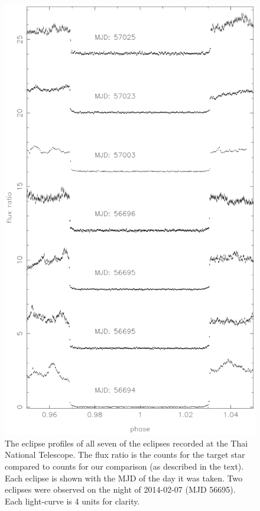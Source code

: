 \documentclass[a4paper,fleqn,usenatbib]{mnras}
\begin{document}
\begin{figure}
\centering
\includegraphics[width=\columnwidth]{images/stacked_eclipses.eps}
\caption{The eclipse profiles of all seven of the eclipses recorded at the Thai National Telescope. The flux ratio is the counts for the target star compared to counts for our comparison (as described in the text). Each eclipse is shown with the MJD of the day it was taken. Two eclipses were observed on the night of 2014-02-07 (MJD 56695). Each light-curve is 4 units for clarity.}
\label{fig:stacked-eclipses}
\end{figure}
\end{document}
